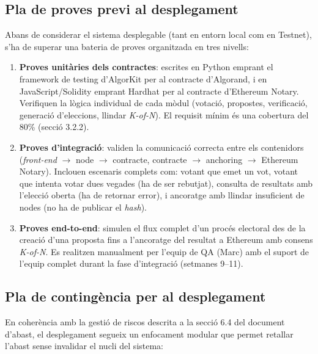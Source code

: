 \subsection{Pla de proves previ al desplegament}
 
Abans de considerar el sistema desplegable (tant en entorn local com en Testnet), s'ha de superar una bateria de proves organitzada en tres nivells:
 
\begin{enumerate}[label=\roman*.]
    \item \textbf{Proves unitàries dels contractes}: escrites en Python emprant el framework de testing d'AlgorKit per al contracte d'Algorand, i en JavaScript/Solidity emprant Hardhat per al contracte d'Ethereum Notary. Verifiquen la lògica individual de cada mòdul (votació, propostes, verificació, generació d'eleccions, llindar \textit{K-of-N}). El requisit mínim és una cobertura del 80\% (secció 3.2.2).
 
    \item \textbf{Proves d'integració}: validen la comunicació correcta entre els contenidors (\textit{front-end} $\rightarrow$ node $\rightarrow$ contracte, contracte $\rightarrow$ anchoring $\rightarrow$ Ethereum Notary). Inclouen escenaris complets com: votant que emet un vot, votant que intenta votar dues vegades (ha de ser rebutjat), consulta de resultats amb l'elecció oberta (ha de retornar error), i ancoratge amb llindar insuficient de nodes (no ha de publicar el \textit{hash}).
 
    \item \textbf{Proves end-to-end}: simulen el flux complet d'un procés electoral des de la creació d'una proposta fins a l'ancoratge del resultat a Ethereum amb consens \textit{K-of-N}. Es realitzen manualment per l'equip de QA (Marc) amb el suport de l'equip complet durant la fase d'integració (setmanes 9--11).
\end{enumerate}
 
\subsection{Pla de contingència per al desplegament}
 
En coherència amb la gestió de riscos descrita a la secció 6.4 del document d'abast, el desplegament segueix un enfocament modular que permet retallar l'abast sense invalidar el nucli del sistema:
 
